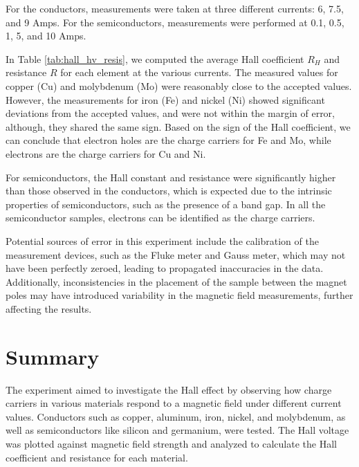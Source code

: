 \documentclass[a4paper,12pt,english]{all-in-one} %
\begin{document}
\begin{multicols}{2}
{For the conductors, measurements were taken at three different currents: 6, 7.5, and 9 Amps. For the semiconductors, measurements were performed at 0.1, 0.5, 1, 5, and 10 Amps.

In Table \ref{tab:hall_hv_resis}, we computed the average Hall coefficient $R_H$ and resistance $R$ for each element at the various currents. The measured values for copper (Cu) and molybdenum (Mo) were reasonably close to the accepted values. However, the measurements for iron (Fe) and nickel (Ni) showed significant deviations from the accepted values, and were not within the margin of error, although, they shared the same sign. Based on the sign of the Hall coefficient, we can conclude that electron holes are the charge carriers for Fe and Mo, while electrons are the charge carriers for Cu and Ni.

For semiconductors, the Hall constant and resistance were significantly higher than those observed in the conductors, which is expected due to the intrinsic properties of semiconductors, such as the presence of a band gap. In all the semiconductor samples, electrons can be identified as the charge carriers.

Potential sources of error in this experiment include the calibration of the measurement devices, such as the Fluke meter and Gauss meter, which may not have been perfectly zeroed, leading to propagated inaccuracies in the data. Additionally, inconsistencies in the placement of the sample between the magnet poles may have introduced variability in the magnetic field measurements, further affecting the results.


}

\end{multicols}

\section*{Summary}
{
The experiment aimed to investigate the Hall effect by observing how charge carriers in various materials respond to a magnetic field under different current values. Conductors such as copper, aluminum, iron, nickel, and molybdenum, as well as semiconductors like silicon and germanium, were tested. The Hall voltage  was plotted against magnetic field strength and analyzed to calculate the Hall coefficient and resistance for each material. 
}
\end{document}
